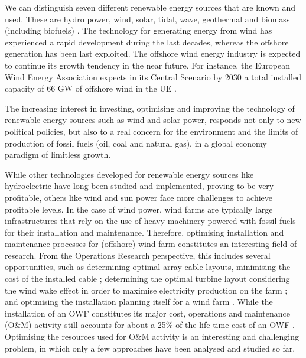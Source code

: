We can distinguish seven different  renewable energy sources that are known and used. These are hydro power, wind, solar, tidal, wave, geothermal and biomass (including biofuels) \cite{Ellabban2014}. The technology for generating energy from wind has experienced a rapid development during the last decades, whereas the offshore generation has been last  exploited. The offshore wind energy industry is expected to continue its growth tendency in the near future. For instance, the European Wind Energy Association expects in its Central Scenario by 2030 a total installed capacity of 66 GW of offshore wind in the UE \cite{WES2030}.

The increasing interest in investing, optimising and improving the technology of renewable energy sources such as wind and solar power, responds not only to new political policies, but also to a real concern for the environment and the limits of production of fossil fuels (oil, coal and natural gas), in a global economy paradigm of limitless growth.

While other technologies developed for renewable energy sources like hydroelectric have long been studied and implemented, proving to be very profitable, others like wind and sun power face more challenges to achieve profitable levels. In the case of wind power, wind farms are typically large infrastructures that rely on the use of heavy machinery powered with fossil fuels for their installation and maintenance. Therefore, optimising installation and maintenance processes for (offshore) wind farm constitutes an interesting field of research. From the Operations Research perspective, this includes several opportunities, such as determining optimal array cable layouts, minimising the cost of the installed cable \cite{Bauer2015}; determining the optimal turbine layout considering the wind wake effect in order to maximise electricity production on the farm \cite{Chowdhury2013}; and optimising the installation planning itself for a wind farm \cite{Scholz-Reiter2011}. While the installation of an OWF constitutes its major cost, operations and maintenance (O\&M) activity still accounts for about a 25\% of the life-time cost of an OWF \cite{DNVGL}. Optimising the resources used for O\&M activity is an interesting and challenging problem, in which only a few approaches have been analysed and studied so far.








